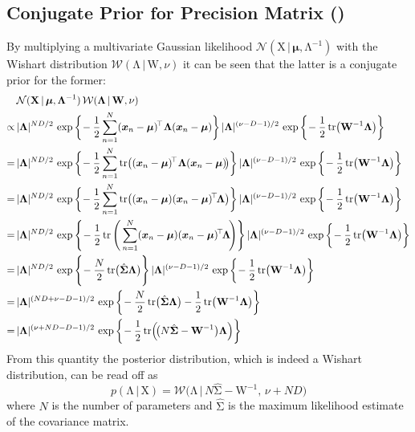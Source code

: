 \documentclass[11pt, a4paper]{scrartcl}
\newcommand{\transposed}{{\!\top\!}}
\renewcommand{\vec}[1]{\bm{#1}}
\newcommand{\mat}[1]{\bm{\mathrm{#1}}}
\newcommand{\given}{\,\vert\,}
\newcommand{\biggiven}{\,\big\vert\,}
\newcommand{\diffstar}{\texorpdfstring{\raisebox{-1pt}{\resizebox{!}{8pt}{\(\star\)}}}{*}}
\newcommand{\onestar}  {(\diffstar)}
\begin{document}
		\subsection{Conjugate Prior for Precision Matrix  \onestar}
			By multiplying a multivariate Gaussian likelihood \( \mathcal{N}(\mat{X} \given \vec{\mu}, \mat{\Lambda}^{-1}) \) with the Wishart distribution \( \mathcal{W}(\mat{\Lambda} \given \mat{W}, \nu) \) it can be seen that the latter is a conjugate prior for the former:
			\begin{align}
				&\, \mathcal{N}(\mat{X} \given \vec{\mu}, \mat{\Lambda}^{-1}) \, \mathcal{W}(\mat{\Lambda} \given \mat{W}, \nu) \\
				\propto&\, \lvert \mat{\Lambda} \rvert^{ND/2} \, \exp\bigg\{\! -\frac{1}{2} \sum_{n = 1}^{N} (\vec{x}_n - \vec{\mu})^\transposed\, \mat{\Lambda} (\vec{x}_n - \vec{\mu}) \bigg\} \, \lvert \mat{\Lambda} \rvert^{(\nu - D - 1) / 2} \, \exp\bigg\{\! -\frac{1}{2} \tr(\mat{W}^{-1} \mat{\Lambda}) \bigg\} \\
				=&\, \lvert \mat{\Lambda} \rvert^{ND/2} \, \exp\bigg\{\! -\frac{1}{2} \sum_{n = 1}^{N} \tr( (\vec{x}_n - \vec{\mu})^\transposed\, \mat{\Lambda} (\vec{x}_n - \vec{\mu}) \!) \bigg\} \, \lvert \mat{\Lambda} \rvert^{(\nu - D - 1) / 2} \, \exp\bigg\{\! -\frac{1}{2} \tr(\mat{W}^{-1} \mat{\Lambda}) \bigg\} \\
				=&\, \lvert \mat{\Lambda} \rvert^{ND/2} \, \exp\bigg\{\! -\frac{1}{2} \sum_{n = 1}^{N} \tr( (\vec{x}_n - \vec{\mu}) (\vec{x}_n - \vec{\mu})^{\transposed} \mat{\Lambda} ) \bigg\} \, \lvert \mat{\Lambda} \rvert^{(\nu - D - 1) / 2} \, \exp\bigg\{\! -\frac{1}{2} \tr(\mat{W}^{-1} \mat{\Lambda}) \bigg\} \\
				=&\, \lvert \mat{\Lambda} \rvert^{ND/2} \, \exp\Bigg\{\! -\frac{1}{2} \tr\Bigg( \sum_{n = 1}^{N} (\vec{x}_n - \vec{\mu}) (\vec{x}_n - \vec{\mu})^\transposed \mat{\Lambda} \!\Bigg) \Bigg\} \, \lvert \mat{\Lambda} \rvert^{(\nu - D - 1) / 2} \, \exp\bigg\{\! -\frac{1}{2} \tr(\mat{W}^{-1} \mat{\Lambda}) \bigg\} \\
				=&\, \lvert \mat{\Lambda} \rvert^{ND/2} \, \exp\Bigg\{\! -\frac{N}{2} \tr\!\big(\hat{\mat{\Sigma}} \mat{\Lambda}\big) \Bigg\} \, \lvert \mat{\Lambda} \rvert^{(\nu - D - 1) / 2} \, \exp\bigg\{\! -\frac{1}{2} \tr(\mat{W}^{-1} \mat{\Lambda}) \bigg\} \\
				=&\, \lvert \mat{\Lambda} \rvert^{(ND + \nu - D - 1) / 2} \, \exp\bigg\{\! -\frac{N}{2} \tr\!\big(\hat{\mat{\Sigma}} \mat{\Lambda}\big) - \frac{1}{2} \tr(\mat{W}^{-1} \mat{\Lambda}) \bigg\} \\
				=&\, \lvert \mat{\Lambda} \rvert^{(\nu + ND - D - 1) / 2} \, \exp\bigg\{\! -\frac{1}{2} \tr(\! \big(N \hat{\mat{\Sigma}} - \mat{W}^{-1} \big) \mat{\Lambda}) \bigg\}
			\end{align}
			From this quantity the posterior distribution, which is indeed a Wishart distribution, can be read off as
			\begin{equation}
				p(\mat{\Lambda} \given \mat{X}) = \mathcal{W}\big( \mat{\Lambda} \biggiven N \hat{\mat{\Sigma}} - \mat{W}^{-1},\, \nu + ND \big)
			\end{equation}
			where \(N\) is the number of parameters and \(\hat{\mat{\Sigma}}\) is the maximum likelihood estimate of the covariance matrix.
\end{document}
